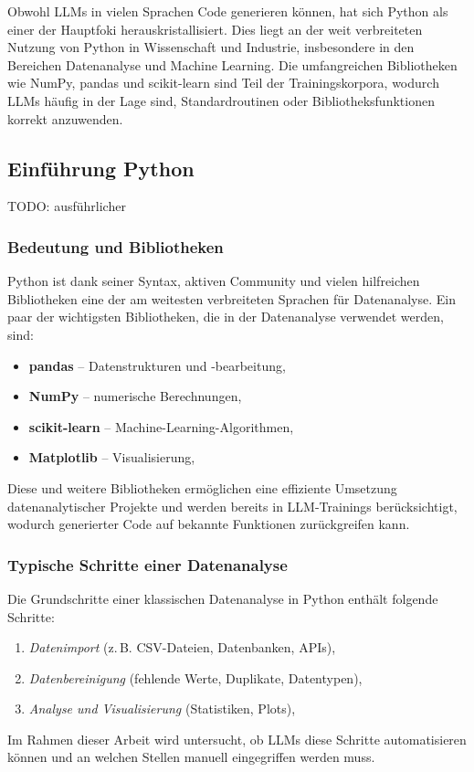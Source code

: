 \documentclass[11pt,a4paper]{article}
\begin{document}
Obwohl LLMs in vielen Sprachen Code generieren können, hat sich Python als einer der Hauptfoki herauskristallisiert. Dies liegt an der weit verbreiteten Nutzung von Python in Wissenschaft und Industrie, insbesondere in den Bereichen Datenanalyse und Machine Learning. Die umfangreichen Bibliotheken wie NumPy, pandas und scikit-learn sind Teil der Trainingskorpora, wodurch LLMs häufig in der Lage sind, Standardroutinen oder Bibliotheksfunktionen korrekt anzuwenden\cite{chen2021evaluatinglargelanguagemodels}.

\subsection{Einführung Python}
\label{sec:Python}
TODO: ausführlicher
\subsubsection{Bedeutung und Bibliotheken}
Python ist dank seiner Syntax, aktiven Community und vielen hilfreichen Bibliotheken eine der am weitesten verbreiteten Sprachen für Datenanalyse. Ein paar der wichtigsten Bibliotheken, die in der Datenanalyse verwendet werden, sind:
\begin{itemize}
    \item \textbf{pandas} -- Datenstrukturen und -bearbeitung,
    \item \textbf{NumPy} -- numerische Berechnungen,
    \item \textbf{scikit-learn} -- Machine-Learning-Algorithmen,
    \item \textbf{Matplotlib} -- Visualisierung,
\end{itemize} 
Diese und weitere Bibliotheken ermöglichen eine effiziente Umsetzung datenanalytischer Projekte und werden bereits in LLM-Trainings berücksichtigt, wodurch generierter Code auf bekannte Funktionen zurückgreifen kann\cite{evalplus,chen2021codex}.

\subsubsection{Typische Schritte einer Datenanalyse}
Die Grundschritte einer klassischen Datenanalyse in Python enthält folgende Schritte:
\begin{enumerate}
    \item \textit{Datenimport} (z.\,B. CSV-Dateien, Datenbanken, APIs),
    \item \textit{Datenbereinigung} (fehlende Werte, Duplikate, Datentypen),
    \item \textit{Analyse und Visualisierung} (Statistiken, Plots),
\end{enumerate}
Im Rahmen dieser Arbeit wird untersucht, ob LLMs diese Schritte automatisieren können und an welchen Stellen manuell eingegriffen werden muss.
\end{document}
